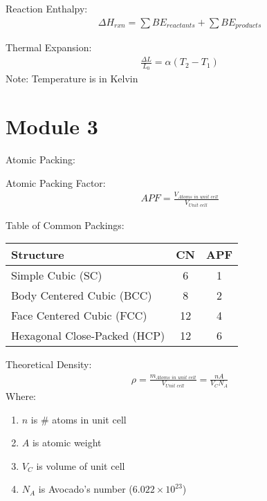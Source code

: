 \documentclass{article}
\begin{document}
\begin{multicols}{2}
Reaction Enthalpy:
\begin{equation*}
    \begin{split}
        \Delta H_{\textit{rxn}} = \sum B E_{\textit{reactants}} + \sum B E_{\textit{products}}
    \end{split}
\end{equation*}

Thermal Expansion:
\begin{equation*}
    \begin{split}
        \frac{\Delta L}{L_0} = \alpha (T_2 - T_1)
    \end{split}
\end{equation*}
Note: Temperature is in Kelvin

\section{Module 3}

Atomic Packing:

Atomic Packing Factor:
\begin{equation*}
    \begin{split}
        \textit{APF} = \frac{V_\textit{Atoms in unit cell}}{V_\textit{Unit cell}} 
    \end{split}
\end{equation*}

Table of Common Packings:
\begin{center}
    \begin{tabular}{ l c c }
        Structure                    & CN & APF \\
        \hline
        Simple Cubic (SC)            & 6  & 1 \\ 
        Body Centered Cubic (BCC)    & 8  & 2 \\  
        Face Centered Cubic (FCC)    & 12 & 4 \\  
        Hexagonal Close-Packed (HCP) & 12 & 6 \\  
    \end{tabular}
\end{center}

Theoretical Density:
\begin{equation*}
    \begin{split}
        \rho = \frac{m_\textit{Atoms in unit cell}}{V_\textit{Unit cell}} = \frac{n A}{V_C N_A}
    \end{split}
\end{equation*}
Where:
\begin{enumerate}
    \item $n$ is \# atoms in unit cell
    \item $A$ is atomic weight
    \item $V_C$ is volume of unit cell
    \item $N_A$ is Avocado's number ($6.022 \times 10^{23}$)
\end{enumerate}


\end{multicols}
\end{document}
